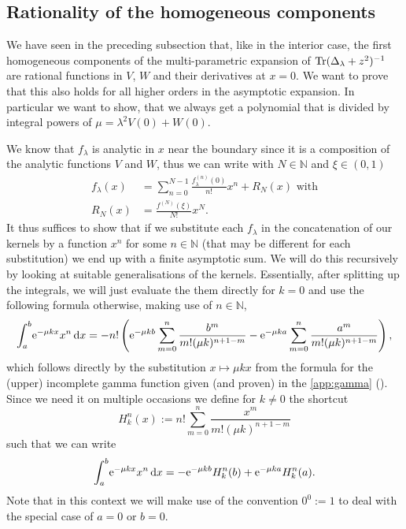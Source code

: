 \subsection{Rationality of the homogeneous components}
We have seen in the preceding subsection that, like in the interior case, the
first homogeneous components of the multi-parametric expansion of
$\Tr(\Delta_\lambda + z^2)^{-1}$ are rational functions in $V$, $W$ and their
derivatives at $x = 0$. We want to prove that this also holds for all higher
orders in the asymptotic expansion. In particular we want to show, that we
always get a polynomial that is divided by integral powers of $\mu = \lambda^2
V(0) + W(0)$.

We know that $f_\lambda$ is analytic in $x$ near the boundary since it is a
composition of the analytic functions $V$ and $W$, thus we can write with
$N\in\mathbb{N}$ and $\xi\in(0,1)$
\begin{align*}
  f_\lambda(x) &= \sum_{n=0}^{N-1} \frac{f_\lambda^{(n)}(0)}{n!} x^n + R_N(x)
  \text{ with} \\ R_N(x) &= \frac{f^{(N)}(\xi)}{N!} x^{N}.
\end{align*}
It thus suffices to show that if we substitute each $f_\lambda$ in the
concatenation of our kernels by a function $x^n$ for some $n\in\mathbb{N}$ (that
may be different for each substitution) we end up with a finite asymptotic sum.
We will do this recursively by looking at suitable generalisations of the
kernels. Essentially, after splitting up the integrals, we will just evaluate
the them directly for $k=0$ and use the following formula otherwise, making use
of $n\in\mathbb{N}$,
\begin{equation}
  \Integ[b]{a}{x}{\Eto{-\mu kx}x^n}
    = -n!\left(\Eto{-\mu kb}\sum_{m=0}^n \frac{b^m}{m!(\mu k)^{n+1-m}} -
              \Eto{-\mu ka}\sum_{m=0}^n \frac{a^m}{m!(\mu k)^{n+1-m}}\right),
\end{equation}
which follows directly by the substitution $x \mapsto \mu kx$ from the formula
for the (upper) incomplete gamma function given (and proven) in the
\cref{app:gamma} (). Since we need it on multiple
occasions we define for $k\ne 0$ the shortcut
\begin{equation*}
  H^n_k(x) := n!\sum_{m=0}^n \frac{x^m}{m!(\mu k)^{n+1-m}}
\end{equation*}
such that we can write
\begin{equation}
  \label{eqn:ex-integ}
  \Integ[b]{a}{x}{\Eto{-\mu kx}x^n} = -\Eto{-\mu kb}H^n_k(b) + \Eto{-\mu
  ka}H^n_k(a).
\end{equation}
Note that in this context we will make use of the convention $0^0 := 1$ to
deal with the special case of $a = 0$ or $b = 0$.

